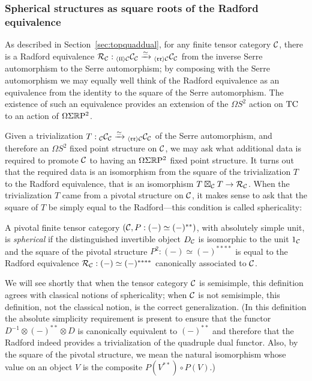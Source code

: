 \documentclass{amsart}
\begin{document}
\subsubsection{Spherical structures as square roots of the Radford equivalence}


As described in Section~\ref{sec:topquaddual}, for any finite tensor category $\mathcal C$, there is a Radford equivalence $\mathcal R_\mathcal C : {}_{\langle \mathfrak{l l} \rangle \mathcal C} \mathcal C_\mathcal C \xrightarrow{\simeq} {}_{\langle \mathfrak{r r} \rangle \mathcal C} \mathcal C_\mathcal C$ from the inverse Serre automorphism to the Serre automorphism; by composing with the Serre automorphism we may equally well think of the Radford equivalence as an equivalence from the identity to the square of the Serre automorphism.  The existence of such an equivalence provides an extension of the $\Omega S^2$ action on $\mathrm{TC}$ to an action of $\Omega \Sigma \mathbb R \mathrm{P}^2$.  

Given a trivialization $T: {}_\mathcal C \mathcal C_\mathcal C \xrightarrow{\simeq} {}_{\langle \mathfrak{r r} \rangle \mathcal C} \mathcal C_\mathcal C$ of the Serre automorphism, and therefore an $\Omega S^2$ fixed point structure on $\mathcal C$, we may ask what additional data is required to promote $\mathcal C$ to having an $\Omega \Sigma \mathbb R \mathrm{P}^2$ fixed point structure.  It turns out that the required data is an isomorphism from the square of the trivialization $T$ to the Radford equivalence, that is an isomorphism $T \boxtimes_\mathcal C T \rightarrow \mathcal R_\mathcal C$.  When the trivialization $T$ came from a pivotal structure on $\mathcal C$, it makes sense to ask that the square of $T$ be simply equal to the Radford---this condition is called sphericality:
\begin{definition} \label{def:spherical}
A pivotal finite tensor category $(\mathcal C, P: (-) \simeq (-)^{**})$, with absolutely simple unit, is \emph{spherical} if the distinguished invertible object $D_\mathcal C$ is isomorphic to the unit $1_\mathcal C$ and the square of the pivotal structure $P^2: (-) \simeq (-)^{****}$ is equal to the Radford equivalence $\mathcal R_\mathcal C: (-) \simeq (-)^{****}$ canonically associated to $\mathcal C$.
\end{definition}
\nid We will see shortly that when the tensor category $\mathcal C$ is semisimple, this definition agrees with classical notions of sphericality; when $\mathcal C$ is not semisimple, this definition, not the classical notion, is the correct generalization.  (In this definition the absolute simplicity requirement is present to ensure that the functor $D^{-1} \otimes (-)^{**} \otimes D$ is canonically equivalent to $(-)^{**}$ and therefore that the Radford indeed provides a trivialization of the quadruple dual functor.  Also, by the square of the pivotal structure, we mean the natural isomorphism whose value on an object $V$ is the composite $P(V^{**}) \circ P(V)$.)  
\end{document}
